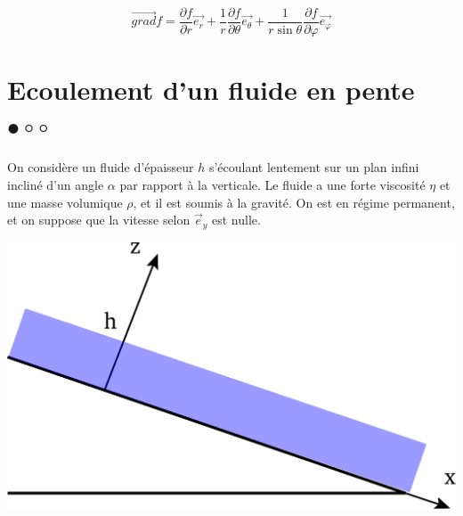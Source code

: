 \documentclass{report}
\begin{document}
\begin{equation}
	\vec{grad} f = \frac{\partial f}{\partial r} \vec{e_r} + \frac{1}{r}\frac{\partial f}{\partial \theta}\vec{e_\theta} + \frac{1}{r\sin\theta}\frac{\partial f}{\partial \varphi}\vec{e_\varphi}
\end{equation}

\newpage

\section*{Ecoulement d'un fluide en pente $\bullet\circ\circ$}

On considère un fluide d'épaisseur $h$ s'écoulant lentement sur un plan infini incliné d'un angle $\alpha$ par rapport à la verticale. Le fluide a une forte viscosité $\eta$ et une masse volumique $\rho$, et il est soumis à la gravité. On est en régime permanent, et on suppose que la vitesse selon $\vec{e}_y$ est nulle.

\begin{center}
	\includegraphics[scale=0.3]{ecoulement.pdf}
\end{center}
\end{document}
